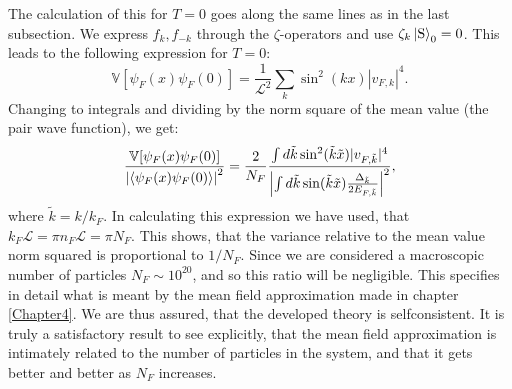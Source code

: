 The calculation of this for $T = 0$ goes along the same lines as in the last subsection. We express $f_k, f_{-k}$ through the $\zeta$-operators and use $\zeta_k \ket{\text{S}}_0 = 0$. This leads to the following expression for $T = 0$:
\begin{equation}
\mathbb{V}[\psi_F(x)\psi_F(0)] = \frac{1}{\mathcal{L}^2}\sum_k \sin^2(kx)|v_{F,k}|^4. \nonumber
\end{equation}
Changing to integrals and dividing by the norm square of the mean value (the pair wave function), we get:
\begin{equation}
\frac{\mathbb{V} [\psi_F(x)\psi_F(0)] }{\left|\braket{\psi_F(x)\psi_F(0)}\right|^2} = \frac{2}{N_F}\frac{\int d\tilde{k} \sin^2(\tilde{k}\tilde{x})|v_{F,\tilde{k}}|^4}{\left| \int d\tilde{k} \sin( \tilde{k}\tilde{x} )\frac{ \Delta_{\tilde{k}} }{ 2E_{F,\tilde{k}} } \right|^2 },
\label{eq.RelativeVarianceSupefluidField}
\end{equation}
where $\tilde{k} = k/k_F$. In calculating this expression we have used, that $k_F \mathcal{L} = \pi n_F \mathcal{L} = \pi N_F$. This shows, that the variance relative to the mean value norm squared is proportional to $1/N_F$. Since we are considered a macroscopic number of particles $N_F \sim 10^{20}$, and so this ratio will be negligible. This specifies in detail what is meant by the mean field approximation made in chapter \ref{Chapter4}. We are thus assured, that the developed theory is selfconsistent. It is truly a satisfactory result to see explicitly, that the mean field approximation is intimately related to the number of particles in the system, and that it gets better and better as $N_F$ increases.  



